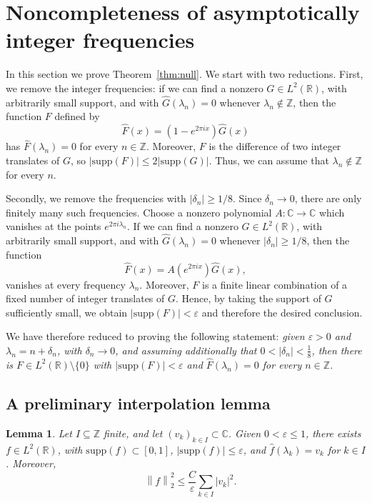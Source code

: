 \documentclass[reqno,a4paper,12pt]{amsart}
\numberwithin{equation}{section}
\newtheorem{lemma}[definition]{Lemma}
\def\Z{{\mathbb Z}}
\def\R{{\mathbb R}}
\def\C{{\mathbb C}}
\newcommand{\supp}{{\mathrm{supp}}}
\newcommand\1{\mathds{1}}
\newcommand{\norm}[1]{\left\lVert #1 \right\rVert}
\begin{document}
\section{Noncompleteness of asymptotically integer frequencies}
\label{sec:asymptotic-integer}

In this section we prove Theorem~\ref{thm:null}. We start with two reductions. First, we remove the integer frequencies: if we can find a
nonzero \(G\in L^2(\R)\), with arbitrarily small support, and with
\(\hat G(\lambda_n)=0\) whenever \(\lambda_n\notin\Z\), then the function
\(F\) defined by
\[
    \hat F(x)=(1-e^{2\pi ix})\hat G(x)
\]
has \(\hat F(\lambda_n)=0\) for every \(n\in\Z\). Moreover, \(F\) is the
difference of two integer translates of \(G\), so
\(|\supp (F)|\leq2|\supp (G)|\). Thus, we can assume that $\lambda_n\notin\Z$ for every $n$.

Secondly, we remove the frequencies with  \(|\delta_n|\geq1/8\). Since \(\delta_n\to0\), there are only finitely many such frequencies. Choose a nonzero polynomial \(A : \C \to \C \)
which vanishes at the points \(e^{2\pi i\lambda_n}\). If we can find a
nonzero \(G\in L^2(\R)\), with arbitrarily small support, and with
\(\hat G(\lambda_n)=0\) whenever \(|\delta_n|\geq 1/8\), then the function 
\[
    \hat F(x)=A(e^{2\pi ix})\hat G(x),
\]
vanishes at every frequency $\lambda_n$. Moreover, \(F\) is a finite linear combination of a fixed number of integer translates of \(G\). Hence, by taking the support of \(G\) sufficiently small, we obtain \(|\supp (F)|<\varepsilon\) and therefore the desired conclusion.

We have therefore reduced to proving the following statement: \textit{given \(\varepsilon>0\) and \(\lambda_n=n+\delta_n\), with \(\delta_n\to 0\), and assuming additionally that \(0<|\delta_n|<\frac18\), then there is \(F\in L^2(\R)\setminus\{0\}\) with \(|\supp (F)|<\varepsilon\) and \(\hat{F}(\lambda_n) = 0\) for every \(n\in\Z\).
}

\subsection{A preliminary interpolation lemma}
\begin{lemma}
\label{lem:asymp-thin-interpolation}
Let 
\(I\subseteq\Z\) finite, and let
\((v_k)_{k\in I} \subset\C\). Given \(0<\varepsilon\leq1\), there exists
\(f\in L^2(\R)\), with $\supp (f)\subset [0,1]$, $|\supp (f)|\leq \varepsilon$, and $\hat f(\lambda_k)=v_k$ for $k\in I$.
Moreover,
$$\quad
    \norm{f}_2^2\leq\frac{C}{\varepsilon}\sum_{k\in I}|v_k|^2.$$
\end{lemma}
\end{document}
